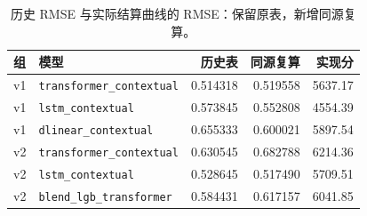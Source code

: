 \begin{table}[!htbp]
\centering\small
\caption{历史 RMSE 与实际结算曲线的 RMSE：保留原表，新增同源复算。}\label{tab:provenance}
\begin{tabularx}{\linewidth}{@{}lXrrr@{}}
\toprule
组 & 模型 & 历史表 & 同源复算 & 实现分 \\
\midrule
v1 & \texttt{transformer\_contextual} & 0.514318 & 0.519558 & 5637.17 \\
v1 & \texttt{lstm\_contextual} & 0.573845 & 0.552808 & 4554.39 \\
v1 & \texttt{dlinear\_contextual} & 0.655333 & 0.600021 & 5897.54 \\
v2 & \texttt{transformer\_contextual} & 0.630545 & 0.682788 & 6214.36 \\
v2 & \texttt{lstm\_contextual} & 0.528645 & 0.517490 & 5709.51 \\
v2 & \texttt{blend\_lgb\_transformer} & 0.584431 & 0.617157 & 6041.85 \\
\bottomrule
\end{tabularx}
\par{}
\end{table}
